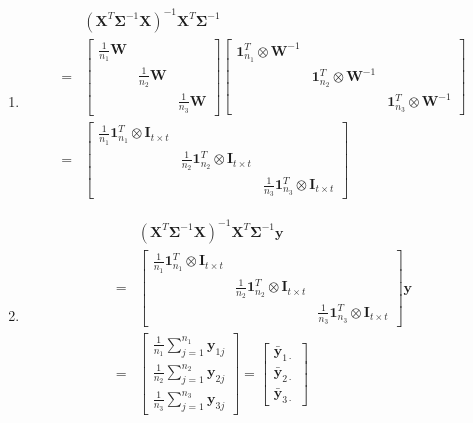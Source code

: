 \documentclass{article}
\begin{document}
\begin{enumerate}[leftmargin = 0 em, label = \arabic*., font = \bfseries]
\begin{enumerate}
		\item 
		\begin{align*}
		&(\bm X^T \bm \Sigma^{-1} \bm X)^{-1} \bm X^T \bm \Sigma^{-1}\\
		 =& \begin{bmatrix}
			\frac{1}{n_1} \bm W \\
			& \frac{1}{n_2} \bm W\\
			&& \frac{1}{n_3} \bm W
		\end{bmatrix} 
		\begin{bmatrix}
			\bm 1_{n_1}^T \otimes \bm W^{-1}\\
			&\bm 1_{n_2}^T \otimes \bm W^{-1}\\
			&& \bm 1_{n_3}^T \otimes \bm W^{-1}
		\end{bmatrix} \\
		=& 
		\begin{bmatrix}
			\frac{1}{n_1} \bm 1_{n_1}^T \otimes \bm I_{t\times t}\\
			&\frac{1}{n_2} \bm 1_{n_2}^T \otimes \bm I_{t\times t}\\
			&& \frac{1}{n_3} \bm 1_{n_3}^T \otimes \bm I_{t \times t}
		\end{bmatrix}
		\end{align*}

		\item 
		\begin{align*}
		&(\bm X^T \bm \Sigma^{-1} \bm X)^{-1} \bm X^T \bm \Sigma^{-1} \bm y\\
		=& \begin{bmatrix}
			\frac{1}{n_1} \bm 1_{n_1}^T \otimes \bm I_{t\times t}\\
			&\frac{1}{n_2} \bm 1_{n_2}^T \otimes \bm I_{t\times t}\\
			&& \frac{1}{n_3} \bm 1_{n_3}^T \otimes \bm I_{t \times t}
		\end{bmatrix}  \bm y\\
		=& \begin{bmatrix}
			\frac{1}{n_1} \sum_{j = 1}^{n_1} \bm y_{1j}\\
			\frac{1}{n_2} \sum_{j= 1}^{n_2} \bm y_{2j}\\
			\frac{1}{n_3} \sum_{j= 1}^{n_3} \bm y_{3j}
		\end{bmatrix} = 	\begin{bmatrix}
				\bar{\bm y}_{1 \cdot}\\
				\bar{\bm y}_{2 \cdot}\\
				\bar{\bm y}_{3 \cdot}
			\end{bmatrix}
		\end{align*}


\end{enumerate}
\end{enumerate}
\end{document}
